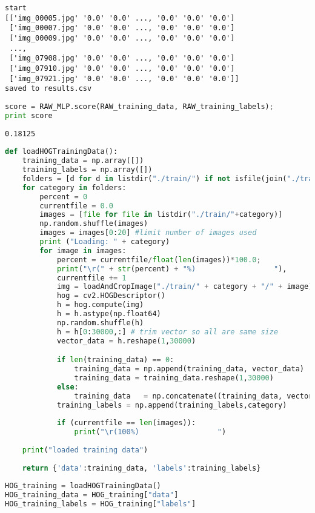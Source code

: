 \begin{lstlisting}
start
[['img_00005.jpg' '0.0' '0.0' ..., '0.0' '0.0' '0.0']
 ['img_00007.jpg' '0.0' '0.0' ..., '0.0' '0.0' '0.0']
 ['img_00009.jpg' '0.0' '0.0' ..., '0.0' '0.0' '0.0']
 ..., 
 ['img_07908.jpg' '0.0' '0.0' ..., '0.0' '0.0' '0.0']
 ['img_07910.jpg' '0.0' '0.0' ..., '0.0' '0.0' '0.0']
 ['img_07921.jpg' '0.0' '0.0' ..., '0.0' '0.0' '0.0']]
saved to results.csv
\end{lstlisting}

\begin{lstlisting}[language=Python]
score = RAW_MLP.score(RAW_training_data, RAW_training_labels);
print score
\end{lstlisting}

\begin{lstlisting}
0.18125
\end{lstlisting}

\begin{lstlisting}[language=Python]
def loadHOGTrainingData():
    training_data = np.array([])
    training_labels = np.array([])
    folders = [d for d in listdir("./train/") if not isfile(join("./train/", d)) and d not in ["cropped"]]
    for category in folders:
        percent = 0
        currentfile = 0.0
        images = [file for file in listdir("./train/"+category)]
        np.random.shuffle(images)
        images = images[0:20] #limit number of images used
        print ("Loading: " + category)
        for image in images:
            percent = currentfile/float(len(images))*100.0;
            print("\r(" + str(percent) + "%)                  "),
            currentfile += 1
            img = loadAndCropImage("./train/" + category + "/" + image)
            hog = cv2.HOGDescriptor()
            h = hog.compute(img)
            h = h.astype(np.float64)
            np.random.shuffle(h)
            h = h[0:30000,:] # trim vector so all are same size
            vector_data = h.reshape(1,30000) 

            if len(training_data) == 0:
                training_data = np.append(training_data, vector_data)
                training_data = training_data.reshape(1,30000)
            else:
                training_data   = np.concatenate((training_data, vector_data), axis=0)
            training_labels = np.append(training_labels,category)
            
            if (currentfile == len(images)):
                print("\r(100%)                  ")
                
    print("loaded training data")
                
    return {'data':training_data, 'labels':training_labels}
            
HOG_training = loadHOGTrainingData()
HOG_training_data = HOG_training["data"]
HOG_training_labels = HOG_training["labels"]
\end{lstlisting}


